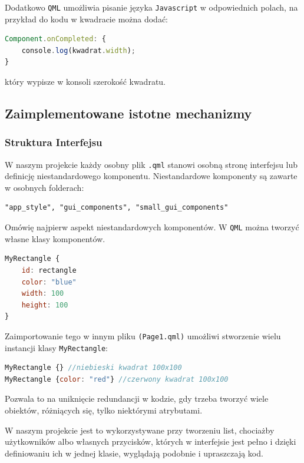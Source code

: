 Dodatkowo \texttt{QML} umożliwia pisanie języka \texttt{Javascript} w odpowiednich polach,
na przykład do kodu w kwadracie można dodać:

\begin{lstlisting}[language=QML, caption={Przykładowy Javascript}]
Component.onCompleted: {
    console.log(kwadrat.width);
}
\end{lstlisting}
który wypisze w konsoli szerokość kwadratu.


\subsection{Zaimplementowane istotne mechanizmy}
\label{sec:ZaimplementowaneIstotneMechanizmy}

\subsubsection{Struktura Interfejsu}
\label{sec:Struktura Interfejsu}
W naszym projekcie każdy osobny plik \texttt{.qml} stanowi osobną stronę interfejsu lub
definicję niestandardowego komponentu. Niestandardowe komponenty są zawarte
w osobnych folderach: \begin{lstlisting}
"app_style", "gui_components", "small_gui_components"
\end{lstlisting}

Omówię najpierw aspekt niestandardowych komponentów. W \texttt{QML} można tworzyć własne klasy komponentów.

\begin{lstlisting}[language=QML, caption={Przykładowa klasa w MyRectangle.qml}]
MyRectangle {
    id: rectangle
    color: "blue"
    width: 100
    height: 100
}
\end{lstlisting}
Zaimportowanie tego w innym pliku \texttt{(Page1.qml)} umożliwi stworzenie
wielu instancji klasy \texttt{MyRectangle}:

\begin{lstlisting}[language=QML, caption={Przykładowe użycie klasy MyRectangle}]
MyRectangle {} //niebieski kwadrat 100x100
MyRectangle {color: "red"} //czerwony kwadrat 100x100
\end{lstlisting}
Pozwala to na uniknięcie redundancji w kodzie, gdy trzeba tworzyć
wiele obiektów, różniących się, tylko niektórymi atrybutami.

W naszym projekcie jest to wykorzystywane przy tworzeniu list, chociażby
użytkowników albo własnych przycisków, których w interfejsie jest pełno i dzięki definiowaniu ich w jednej klasie, wyglądają podobnie i upraszczają kod.

